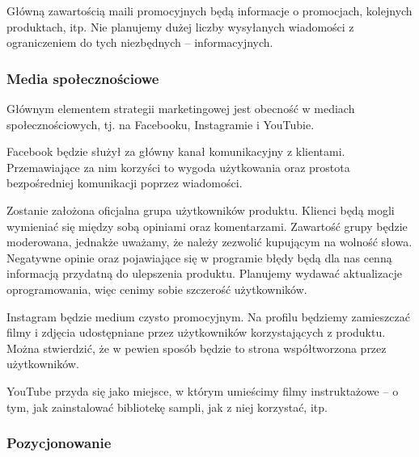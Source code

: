 \documentclass[12pt]{article}
\begin{document}
Główną zawartością maili promocyjnych będą informacje o promocjach, kolejnych produktach, itp.
Nie planujemy dużej liczby wysyłanych wiadomości z ograniczeniem do tych niezbędnych -- informacyjnych.

\subsubsection{Media społecznościowe}

Głównym elementem strategii marketingowej jest obecność w mediach społecznościowych, tj. na Facebooku, Instagramie i YouTubie.

Facebook będzie służył za główny kanał komunikacyjny z klientami.
Przemawiające za nim korzyści to wygoda użytkowania oraz prostota bezpośredniej komunikacji poprzez wiadomości.


Zostanie założona oficjalna grupa użytkowników produktu.
Klienci będą mogli wymieniać się między sobą opiniami oraz komentarzami.
Zawartość grupy będzie moderowana, jednakże uważamy, że należy zezwolić kupującym na wolność słowa.
Negatywne opinie oraz pojawiające się w programie błędy będą dla nas cenną informacją przydatną do ulepszenia produktu.
Planujemy wydawać aktualizacje oprogramowania, więc cenimy sobie szczerość użytkowników.

Instagram będzie medium czysto promocyjnym.
Na profilu będziemy zamieszczać filmy i zdjęcia udostępniane przez użytkowników korzystających z produktu.
Można stwierdzić, że w pewien sposób będzie to strona współtworzona przez użytkowników.

YouTube przyda się jako miejsce, w którym umieścimy filmy instruktażowe -- o tym, jak zainstalować bibliotekę sampli, jak z niej korzystać, itp.


\subsubsection{Pozycjonowanie}
\end{document}
